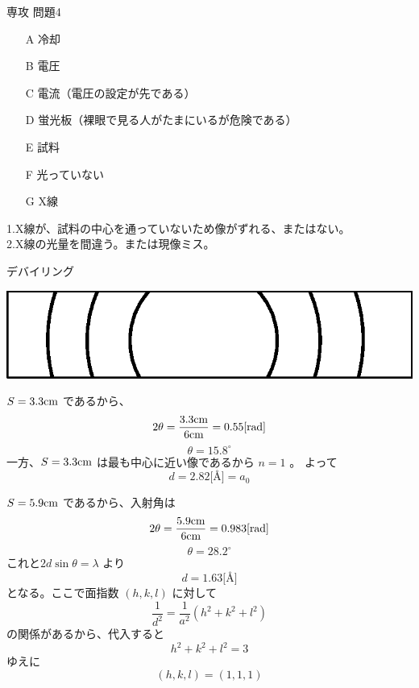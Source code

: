 \documentclass[fleqn]{jbook}
\begin{document}
\begin{answer}{専攻 問題4}{}

\begin{subanswers}
\SubAnswer
\begin{itemize}
\item[A] \quad 冷却
\item[B] \quad 電圧
\item[C] \quad 電流（電圧の設定が先である）
\item[D] \quad 蛍光板（裸眼で見る人がたまにいるが危険である）
\item[E] \quad 試料
\item[F] \quad 光っていない
\item[G] \quad X線
\end{itemize}

\SubAnswer
1.X線が、試料の中心を通っていないため像がずれる、またはない。\\
2.X線の光量を間違う。または現像ミス。

\SubAnswer
デバイリング
\begin{center}
\includegraphics[clip]{1992phy4-2.eps}
\end{center}

\SubAnswer
$ S=3.3 \rm{cm}$ であるから、
\[ 2 \theta = \frac{3.3 {\rm cm}}{6 {\rm cm}} =0.55  [{\rm rad}] \]
\[ \theta =15.8^{\circ} \]
一方、$ S=3.3 \rm{cm}$ は最も中心に近い像であるから $n=1$ 。
よって
\[ d=2.82  \mbox{[\AA]} = a_0 \]

\SubAnswer
$S=5.9  \rm{cm}$ であるから、入射角は
\[ 2 \theta = \frac{5.9 \rm{cm}}{6 \rm{cm}} =0.983 [\rm{rad}] \]
\[ \theta =28.2^{\circ} \]
これと$2d \sin \theta =\lambda $ より
\[ d=1.63 \mbox{[\AA]} \]
となる。ここで面指数 $(h,k,l)$ に対して
\[ \frac{1}{d^2}=\frac{1}{a^2}(h^2+k^2+l^2) \]
の関係があるから、代入すると
\[ h^2+k^2+l^2 =3 \]
ゆえに
\[ (h,k,l)=(1,1,1) \]

\end{subanswers}
\end{answer}
\end{document}
